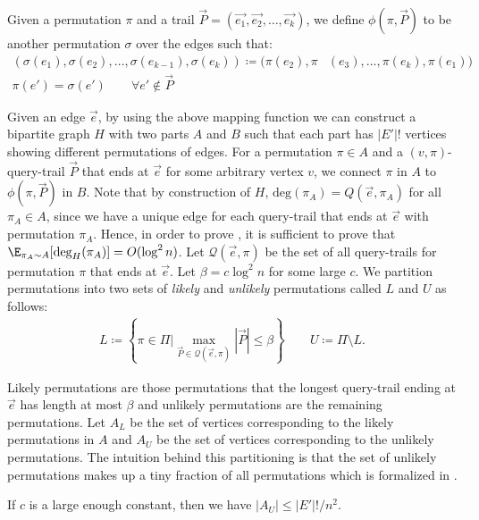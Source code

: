 Given a permutation $\pi$ and a trail $\vec{P}=(\vec{e_1}, \vec{e_2}, \ldots, \vec{e_k})$, we define $\phi(\pi, \vec{P})$ to be another permutation $\sigma$ over the edges such that:
\begin{align*}
    (\sigma(e_1), \sigma(e_2), \ldots, \sigma(e_{k-1}), \sigma(e_k)) \coloneqq (\pi(e_2), \pi&(e_3), \ldots, \pi(e_{k}), \pi(e_{1}))\\
    \pi(e') = \sigma(e') \quad\quad \forall e' \notin \vec{P}
\end{align*}

Given an edge $\vec{e}$, by using the above mapping function we can construct a bipartite graph $H$ with two parts $A$ and $B$ such that each part has $|E'|!$ vertices showing different permutations of edges. For a permutation $\pi \in A$ and a $(v,\pi)$-query-trail $\vec{P}$ that ends at $\vec{e}$ for some arbitrary vertex $v$, we connect $\pi$ in $A$ to $\phi(\pi, \vec{P})$ in $B$. Note that by construction of $H$, $\text{deg}(\pi_A) = Q(\vec{e},\pi_A)$ for all $\pi_A \in A$, since we have a unique edge for each query-trail that ends at $\vec{e}$ with permutation $\pi_A$. Hence, in order to prove , it is sufficient to prove that $\E_{\pi_A \sim A}[\text{deg}_H(\pi_A)]=O(\log^2 n)$. Let $\mathcal{Q}(\vec{e}, \pi)$ be the set of all query-trails for permutation $\pi$ that ends at $\vec{e}$. Let $\beta = c \log^2 n$ for some large $c$. We partition permutations into two sets of {\em likely} and {\em unlikely} permutations called $L$ and $U$ as follows:
\begin{align*}
    L \coloneqq \left\{\pi \in \Pi \Big\lvert \max_{\vec{P} \in \mathcal{Q}(\vec{e}, \pi)} |\vec{P}| \leq \beta \right\} \quad\quad U \coloneqq \Pi \setminus L.
\end{align*}

Likely permutations are those permutations that the longest query-trail ending at $\vec{e}$ has length at most $\beta$ and unlikely permutations are the remaining permutations. Let $A_L$ be the set of vertices corresponding to the likely permutations in $A$ and $A_U$ be the set of vertices corresponding to the unlikely permutations. The intuition behind this partitioning is that the set of unlikely permutations makes up a tiny fraction of all permutations which is formalized in .

\begin{lemma}\label{lem: few-long-trail}
If $c$ is a large enough constant, then we have $|A_U| \leq |E'|! / n^2$.
\end{lemma}

